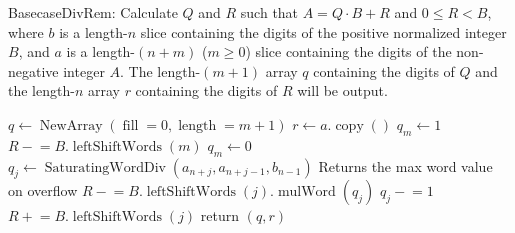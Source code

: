 \documentclass{computer-arithmetic}
\begin{document}
\begin{algorithm}
  \caption{BasecaseDivRem: Calculate \(Q\) and \(R\) such that
    \(A = Q ⋅ B + R\) and \(0 ≤ R < B\), where \(b\) is a length-\(n\)
    slice containing the digits of the positive normalized integer
    \(B\), and \(a\) is a length-\((n + m)\) (\(m ≥ 0\)) slice
    containing the digits of the non-negative integer \(A\). The
    length-\((m+1)\) array \(q\) containing the digits of \(Q\) and
    the length-\(n\) array \(r\) containing the digits of \(R\) will
    be output.}
  \begin{algorithmic}[1]
    \State \(q ← \operatorname{NewArray}(\operatorname{fill}=0, \operatorname{length}=m + 1)\)
\State \(r ← a.\operatorname{copy}()\)
\State \(q_m ← 1\)
\State \(R \mathrel{-}= B.\operatorname{leftShiftWords}(m)\)
\Else
\State \(q_m ← 0\)
\EndIf
{}
\State \(q_j ← \operatorname{SaturatingWordDiv}(a_{n+j}, a_{n + j - 1}, b_{n-1})\)
\Comment Returns the max word value on overflow
\State \(R \mathrel{-}= B.\operatorname{leftShiftWords}(j).\operatorname{mulWord}(q_j)\)
\State \(q_j \mathrel{-}= 1\)
\State \(R \mathrel{+}= B.\operatorname{leftShiftWords}(j)\)
\EndWhile
\EndFor
\State return \((q, r)\)
\end{algorithmic}
\end{algorithm}
\end{document}
